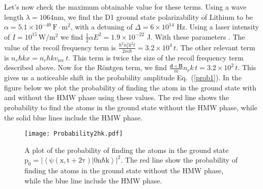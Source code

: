 \documentclass[twocolumn,english,pra,aps,superscriptaddress,floatfix]{revtex4-1}
\begin{document}
Let's now check the maximum obtainable value for these terms. Using a wave length $\lambda=1064$nm, we find the D1 ground state polarizability of Lithium to be $\alpha =5.1\times 10^{-40} \,\mathrm{F\cdot m^2}$, with a detuning of $\Delta=6\times10^{14}$ Hz.  Using a laser intensity of $I=10^{15}\,\mathrm{W/m^2}$ we find $\frac{1}{2}\alpha E^2=1.9\times 10^{-22}$ J. With these parameters . The value of the recoil frequency term is $\frac{\hbar^2n_r^2k^2t}{2m\hbar}=3.2\times 10^4\, t$. The other relevant term is $n_r\hbar kx=n_r\hbar k v_{\mathrm{rec}}\,t$.  This term is twice the size of the recoil frequency term described above. Now for the R\"{o}ntgen term, we find $\frac{\mathbf{d}\times\mathbf{B}}{m}n_rk\,t=3.2\times10^2\,t$.  This gives us a noticeable shift in the probability amplitude Eq.\ (\ref{prob1}).
In the figure below we plot the probability of finding the atom in the ground state with and without the HMW phase using these values. The red line shows the probability to find the atoms in the ground state without the HMW phase, while the solid blue lines include the HMW phase.
\begin{figure}
\texttt{[image: Probability2hk.pdf]}
\caption{A plot of the probability of finding the atoms in the ground state $\mathrm{p_0=|\left<\psi(x,t+2\tau)|0n\hbar k\right>|^2}$. The red line show the probability of finding the atoms in the ground state without the HMW phase, while the blue line include the HMW phase.} 
\label{fig:prob}
\end{figure}


\vspace{5mm}
\end{document}
